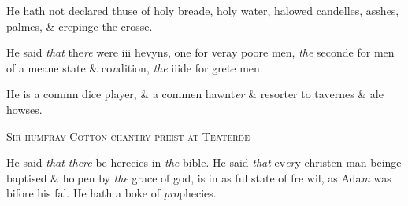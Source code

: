 \documentclass[12pt, a4paper]{book}
\begin{document}
				\marginpar[\vspace{0.5cm}{\textcolor{Gray}{ceremonies}}]{}
			
		\ifthenelse{\isodd{\thepage}}
		{\reversemarginpar}
		{\normalmarginpar}
		He hath not declared thuse of holy breade, holy water,
 halowed candelles, asshes, palmes, \& crepinge the crosse.

		\ifthenelse{\isodd{\thepage}}
		{\reversemarginpar}
		{\normalmarginpar}
		He said \textit{that} the\textit{re} were iii hevyns, one for veray poore men,
 \textit{the} seconde for men of a meane state \& co\textit{n}dition, \textit{the} iiide
 for grete men.

		\ifthenelse{\isodd{\thepage}}
		{\reversemarginpar}
		{\normalmarginpar}
		He is a commn dice player, \& a commen hawnt\textit{er} \& resorter
 to tavernes \& ale howses.
 

            
            	
				\begin{center} \begin{large} {\scshape Sir humfray Cotton chantry preist at Te\textit{n}terde
			} \end{large} \end{center}
			

 
		\ifthenelse{\isodd{\thepage}}
		{\reversemarginpar}
		{\normalmarginpar}
		He said \textit{that there} be herecies in \textit{the} bible.
 He said \textit{that} ev\textit{er}y christen man beinge baptised \& holpen
 by \textit{the} grace of god, is in as ful state of fre wil, as Ada\textit{m}
 was bifore his fal.
 He hath a boke of \textit{pro}phecies.
			


            
\dotfill
					  \subsection*{}  \subsection*{}  \subsection*{}
\end{document}

